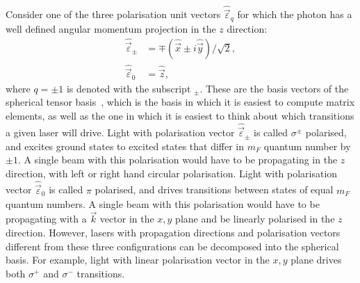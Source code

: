 Consider one of the three polarisation unit vectors $\hat{\vec\varepsilon}_q$ for which the photon has a well defined angular momentum projection in the $z$ direction:
\begin{align}
\hat{\vec\varepsilon}_{\pm} &= \mp(\hat{\vec{x}} \pm i \hat{\vec y})/\sqrt{2},\\
\hat{\vec\varepsilon}_{0} &= \hat{\vec z},
\end{align}
where $q=\pm1$ is denoted with the subscript $_\pm$. These are the basis vectors of the spherical tensor basis~\cite{steck_quantum_2017}, which is the basis in which it is easiest to compute matrix elements, as well as the one in which it is easiest to think about which transitions a given laser will drive. Light with polarisation vector $\hat{\vec\varepsilon}_{\pm}$ is called $\sigma^\pm$ polarised, and excites ground states to excited states that differ in $m_F$ quantum number by $\pm 1$. A single beam with this polarisation would have to be propagating in the $z$ direction, with left or right hand circular polarisation. Light with polarisation vector $\hat{\vec\varepsilon}_0$ is called $\pi$ polarised, and drives transitions between states of equal $m_F$ quantum numbers. A single beam with this polarisation would have to be propagating with a $\vec k$ vector in the $x,y$ plane and be linearly polarised in the $z$ direction. However, lasers with propagation directions and polarisation vectors different from these three configurations can be decomposed into the spherical basis. For example, light with linear polarisation vector in the $x,y$ plane drives both $\sigma^+$ and $\sigma^-$ transitions.

